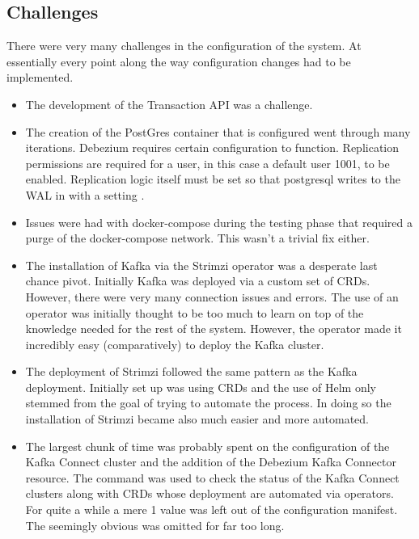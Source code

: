 \begin{flushleft}
    \section{Challenges}
    There were very many challenges in the configuration of the system. At essentially every point along the way configuration changes had to be 
    implemented.
    \begin{itemize}
        \item The development of the Transaction API was a challenge.
        \item The creation of the PostGres container that is configured went through many iterations. Debezium requires certain configuration 
        to function. Replication permissions are required for a user, in this case a default user 1001, to be enabled. Replication logic itself
        must be set so that postgresql writes to the WAL in with a  setting \autocite{LogicalDecodingOutput}.
        \item Issues were had with docker-compose during the testing phase that required a purge of the docker-compose network. This wasn't a trivial
        fix either.
        \item The installation of Kafka via the Strimzi operator was a desperate last chance pivot. Initially Kafka was deployed via a custom 
        set of CRDs. However, there were very many connection issues and  errors. The use of an operator was initially 
        thought to be too much to learn on top of the knowledge needed for the rest of the system. \newline However, the operator made it incredibly 
        easy (comparatively) to deploy the Kafka cluster.
        \item The deployment of Strimzi followed the same pattern as the Kafka deployment. Initially set up was using CRDs and the 
        use of Helm only stemmed from the goal of trying to automate the process. In doing so the installation of Strimzi became also much 
        easier and more automated.
        \item The largest chunk of time was probably spent on the configuration of the Kafka Connect cluster and the addition of the 
        Debezium Kafka Connector resource. The  command was used to check the status of the Kafka Connect clusters along 
        with CRDs whose deployment are automated via operators.\newline
        For quite a while a mere 1 value was left out of the configuration manifest. The seemingly obvious 
        was omitted for far too long.
    \end{itemize}
\end{flushleft}